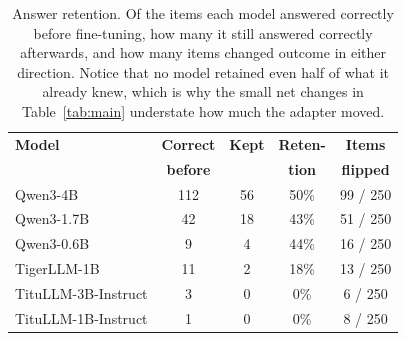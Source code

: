 \begin{table}[htbp]
\caption{Answer retention. Of the items each model answered correctly
before fine-tuning, how many it still answered correctly afterwards, and
how many items changed outcome in either direction. Notice that no model
retained even half of what it already knew, which is why the small net
changes in Table~\ref{tab:main} understate how much the adapter moved.}
\label{tab:retention}
\centering
\footnotesize
\setlength{\tabcolsep}{4pt}
\begin{tabular}{|l|c|c|c|c|}
\hline
\textbf{Model} & \textbf{Correct} & \textbf{Kept} & \textbf{Reten-} & \textbf{Items} \\
               & \textbf{before}  &               & \textbf{tion}   & \textbf{flipped} \\
\hline
Qwen3-4B & 112 & 56 & 50\% & 99 / 250 \\
Qwen3-1.7B & 42 & 18 & 43\% & 51 / 250 \\
Qwen3-0.6B & 9 & 4 & 44\% & 16 / 250 \\
TigerLLM-1B & 11 & 2 & 18\% & 13 / 250 \\
TituLLM-3B-Instruct & 3 & 0 & 0\% & 6 / 250 \\
TituLLM-1B-Instruct & 1 & 0 & 0\% & 8 / 250 \\
\hline
\end{tabular}
\end{table}
